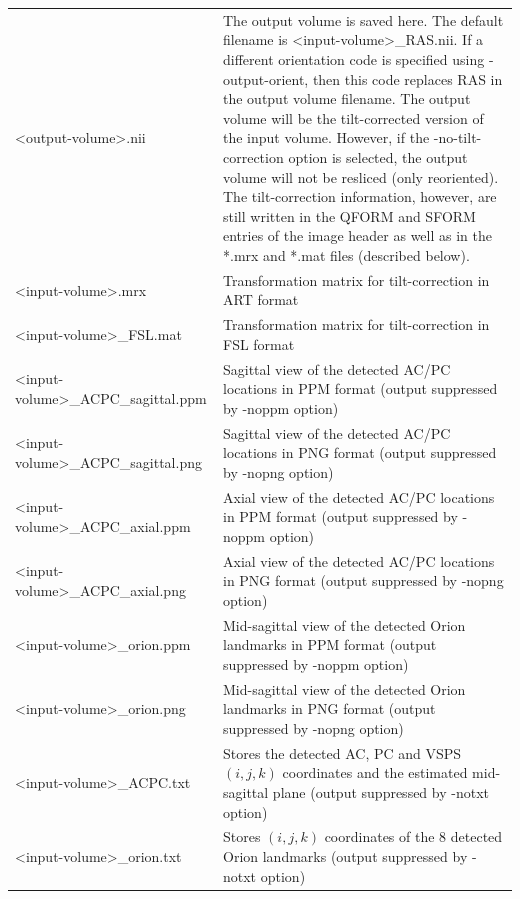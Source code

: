 \documentclass[11pt]{article}
\begin{document}

\begin{longtable}{p{}p{}}
\textless output-volume\textgreater.nii &
	The output volume is saved here. The default filename is
	\textless input-volume\textgreater\_RAS.nii. If a different orientation code is
specified using -output-orient, then this code replaces RAS in the output volume filename.
The output volume will be the tilt-corrected
	version of the input volume. However, if the -no-tilt-correction option is
	selected, the output volume will not be resliced (only reoriented). The
	tilt-correction information, however, are still written in the QFORM and
	SFORM entries of the image header as well as in the *.mrx and *.mat files
	(described below). \\

\textless input-volume\textgreater.mrx &
	Transformation matrix for tilt-correction in ART format \\

\textless input-volume\textgreater \_FSL.mat &
	Transformation matrix for tilt-correction in FSL format \\

\textless input-volume\textgreater \_ACPC\_sagittal.ppm &
	Sagittal view of the detected AC/PC locations in
	PPM format (output suppressed by -noppm option) \\

\textless input-volume\textgreater \_ACPC\_sagittal.png &
	Sagittal view of the detected AC/PC locations in
	PNG format (output suppressed by -nopng option) \\

\textless input-volume\textgreater \_ACPC\_axial.ppm &
	Axial view of the detected AC/PC locations in PPM
	format (output suppressed by -noppm option) \\

\textless input-volume\textgreater \_ACPC\_axial.png &
	Axial view of the detected AC/PC locations in PNG
	format (output suppressed by -nopng option) \\

\textless input-volume\textgreater \_orion.ppm &
	Mid-sagittal view of the detected Orion landmarks in
	PPM format (output suppressed by -noppm option) \\

\textless input-volume\textgreater \_orion.png &
	Mid-sagittal view of the detected Orion landmarks in
	PNG format (output suppressed by -nopng option) \\

\textless input-volume\textgreater \_ACPC.txt &
	Stores the detected AC, PC and VSPS $(i, j, k)$ coordinates and the
	estimated mid-sagittal plane (output suppressed by -notxt option) \\

\textless input-volume\textgreater \_orion.txt &
	Stores $(i, j, k)$ coordinates of the 8 detected Orion
	landmarks (output suppressed by -notxt option)
\end{longtable}
\end{document}
